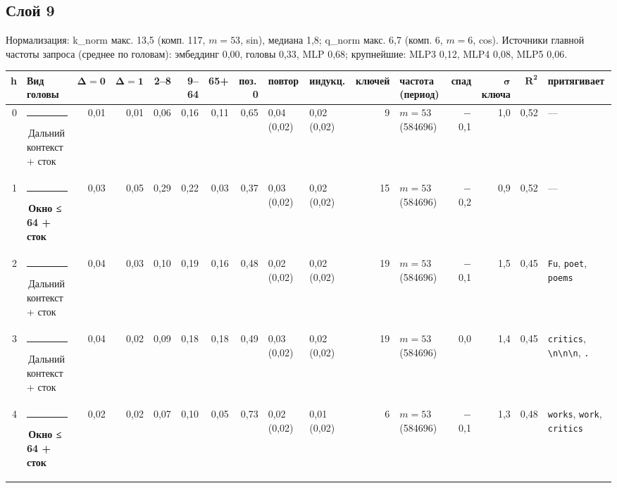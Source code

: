 \documentclass[10pt]{article}
\begin{document}
\noindent\begin{minipage}{\linewidth}
\subsection*{Слой 9}
{\small\color{ink2} Нормализация: k\_norm макс. 13,5 (комп. 117, $m{=}53$, sin), медиана 1,8; q\_norm макс. 6,7 (комп. 6, $m{=}6$, cos). Источники главной частоты запроса (среднее по головам): эмбеддинг 0,00, головы 0,33, MLP 0,68; крупнейшие: MLP3 0,12, MLP4 0,08, MLP5 0,06.}
\begin{center}{\footnotesize\begin{tabular}{|r|l|r|r|r|r|r|r|l|l|r|l|r|r|r|l|}
\hline
\rowcolor{head}\textbf{h} & \textbf{Вид головы} & $\boldsymbol{\Delta{=}0}$ & $\boldsymbol{\Delta{=}1}$ & \textbf{2–8} & \textbf{9–64} & \textbf{65+} & \textbf{поз.\,0} & \textbf{повтор} & \textbf{индукц.} & \textbf{ключей} & \textbf{частота (период)} & \textbf{спад} & $\boldsymbol{\sigma}$ \textbf{ключа} & $\boldsymbol{R^2}$ & \textbf{притягивает} \\ \hline
0 & \textcolor[HTML]{C3C2B7}{\rule{0.62em}{0.62em}}\,Дальний контекст + сток & 0,01 & 0,01 & 0,06 & 0,16 & 0,11 & 0,65 & 0,04 (0,02) & 0,02 (0,02) & 9 & $m{=}53$ (584696) & $-$0,1 & 1,0 & 0,52 & — \\ \hline
1 & \textcolor[HTML]{EDA100}{\rule{0.62em}{0.62em}}\,\textbf{Окно ≤ 64 + сток} & 0,03 & 0,05 & 0,29 & 0,22 & 0,03 & 0,37 & 0,03 (0,02) & 0,02 (0,02) & 15 & $m{=}53$ (584696) & $-$0,2 & 0,9 & 0,52 & — \\ \hline
2 & \textcolor[HTML]{C3C2B7}{\rule{0.62em}{0.62em}}\,Дальний контекст + сток & 0,04 & 0,03 & 0,10 & 0,19 & 0,16 & 0,48 & 0,02 (0,02) & 0,02 (0,02) & 19 & $m{=}53$ (584696) & $-$0,1 & 1,5 & 0,45 & \texttt{\textvisiblespace{}Fu}, \texttt{\textvisiblespace{}poet}, \texttt{\textvisiblespace{}poems} \\ \hline
3 & \textcolor[HTML]{C3C2B7}{\rule{0.62em}{0.62em}}\,Дальний контекст + сток & 0,04 & 0,02 & 0,09 & 0,18 & 0,18 & 0,49 & 0,03 (0,02) & 0,02 (0,02) & 19 & $m{=}53$ (584696) & 0,0 & 1,4 & 0,45 & \texttt{\textvisiblespace{}critics}, \texttt{\textvisiblespace{}\textbackslash{}n\textbackslash{}n\textbackslash{}n}, \texttt{\textvisiblespace{}.} \\ \hline
4 & \textcolor[HTML]{EDA100}{\rule{0.62em}{0.62em}}\,\textbf{Окно ≤ 64 + сток} & 0,02 & 0,02 & 0,07 & 0,10 & 0,05 & 0,73 & 0,02 (0,02) & 0,01 (0,02) & 6 & $m{=}53$ (584696) & $-$0,1 & 1,3 & 0,48 & \texttt{\textvisiblespace{}works}, \texttt{\textvisiblespace{}work}, \texttt{\textvisiblespace{}critics} \\ \hline

\end{tabular}}
\end{center}
\end{minipage}
\end{document}

